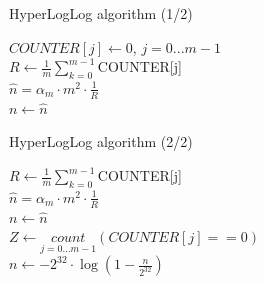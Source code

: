 \documentclass[10pt]{beamer}
\begin{document}
\begin{frame}{HyperLogLog algorithm (1/2)}
  \begin{algorithm}[H]
    \DontPrintSemicolon
    \caption[]{Estimatin cardinality with \textit{HyperLogLog}}
    $COUNTER[j] \gets $0, $j = 0...m - 1$\\
    $R \gets \frac{1}{m} \sum\limits_{k=0}^{m-1}$COUNTER[j] \\
    $\hat{n} = \alpha_m \cdot m^2 \cdot \frac{1}{R}$ \\
    $n \gets \hat{n}$ \\
\end{algorithm}
\end{frame}
\begin{frame}{HyperLogLog algorithm (2/2)}
  \begin{algorithm}[H]
    \DontPrintSemicolon
    \LinesNumberedHidden
    $R \gets \frac{1}{m} \sum\limits_{k=0}^{m-1}$COUNTER[j] \\
    $\hat{n} = \alpha_m \cdot m^2 \cdot \frac{1}{R}$ \\
    $n \gets \hat{n}$ \\
    {
        $Z \gets \underset{j=0...m-1}{count}\left(COUNTER[j] == 0\right)$\\
    }
    {
        $n \gets -2^{32}\cdot\log\left(1-\frac{n}{2^{32}}\right)$
    }
\end{algorithm}
\end{frame}
\end{document}
